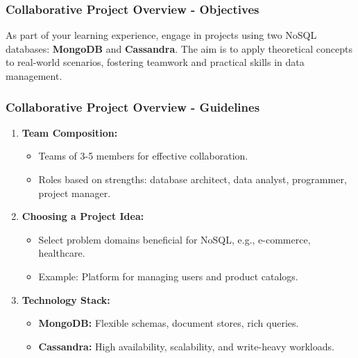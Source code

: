 \documentclass[aspectratio=169]{beamer}
\begin{document}
\begin{frame}[fragile]
    \frametitle{Collaborative Project Overview - Objectives}
    As part of your learning experience, engage in projects using two NoSQL databases: 
    \textbf{MongoDB} and \textbf{Cassandra}. The aim is to apply theoretical concepts to real-world scenarios, fostering teamwork and practical skills in data management.
\end{frame}

\begin{frame}[fragile]
    \frametitle{Collaborative Project Overview - Guidelines}
    \begin{enumerate}
        \item \textbf{Team Composition:}
        \begin{itemize}
            \item Teams of 3-5 members for effective collaboration.
            \item Roles based on strengths: database architect, data analyst, programmer, project manager.
        \end{itemize}
        
        \item \textbf{Choosing a Project Idea:}
        \begin{itemize}
            \item Select problem domains beneficial for NoSQL, e.g., e-commerce, healthcare.
            \item Example: Platform for managing users and product catalogs.
        \end{itemize}
        
        \item \textbf{Technology Stack:}
        \begin{itemize}
            \item \textbf{MongoDB:} Flexible schemas, document stores, rich queries.
            \item \textbf{Cassandra:} High availability, scalability, and write-heavy workloads.
        \end{itemize}
    \end{enumerate}
\end{frame}
\end{document}
